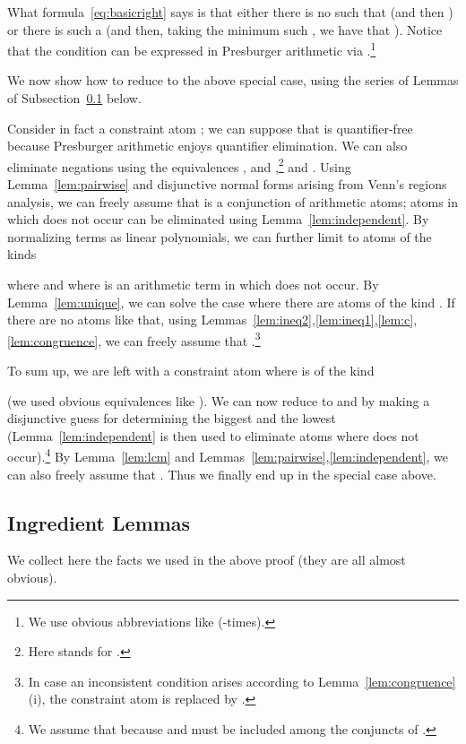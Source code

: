 \documentclass[11pt,a4paper]{article}
\begin{document}
{What formula~\eqref{eq:basicright} says is that either there is no  such that  (and then ) or there is such a  (and then, taking the minimum such ,
we have that ). Notice that the condition   can be expressed in Presburger arithmetic via .\footnote{
We use obvious abbreviations like  (-times).
}

We now show how to reduce to the above special case, using the series of Lemmas of Subsection~\ref{subsec:lemmmas} below.

Consider in fact a constraint atom ; we can suppose that  is quantifier-free because Presburger arithmetic enjoys quantifier elimination. We can also eliminate negations using the equivalences  , and ,\footnote{
Here  stands for .} 
and .
Using Lemma~\ref{lem:pairwise} and  disjunctive normal forms arising from Venn's regions analysis, we can freely assume that  is a conjunction
of arithmetic atoms; atoms in which  does not occur can be eliminated using Lemma~\ref{lem:independent}.
By normalizing terms as linear polynomials, we can further limit to atoms of the kinds

where   and where  is an arithmetic term in which  does not occur. 
By Lemma~\ref{lem:unique}, we can solve the case where there are atoms of the kind . If there are no atoms like that,
using Lemmas~\ref{lem:ineq2},\ref{lem:ineq1},\ref{lem:c},\ref{lem:congruence}, we can freely assume that .\footnote{ In case an inconsistent condition
arises according to Lemma~\ref{lem:congruence}(i), the constraint atom is replaced by .}


To sum up, we are left with a constraint atom  where  is of the kind

(we  used  obvious equivalences like ).
We can now reduce to  and  by making a disjunctive guess for determining the biggest  and the lowest  
(Lemma~\ref{lem:independent} is then used to eliminate atoms where  does not occur).\footnote{We  assume that 
because  and  must be included among the conjuncts of .}
By Lemma~\ref{lem:lcm} and Lemmas~\ref{lem:pairwise},\ref{lem:independent}, we can also freely assume that . Thus we finally end up in the special case above.
 


\subsection{Ingredient Lemmas}\label{subsec:lemmmas}

We collect here the facts we used  in the above proof (they are all almost obvious).

}
\end{document}
